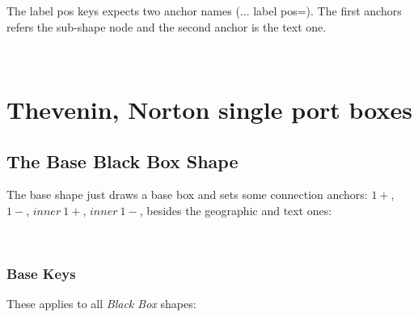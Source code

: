 \documentclass[10pt]{article}
\begin{document}
\begin{tsremark}
The label pos keys expects two anchor names (... label pos=). The first anchors refers the sub-shape node and the second anchor is the text one.
\end{tsremark}

~

\section{Thevenin, Norton single port boxes}


\subsection{The Base Black Box Shape}\label{BBanchors}

The base shape just draws a base box and sets some connection anchors: $1+$, $1-$, $inner\ 1+$, $inner\ 1-$, besides the geographic and text ones:


\begin{center}%
\end{center}

        
~   

\subsubsection{Base Keys}\label{BBkeys}

These applies to all \emph{Black Box} shapes:
\end{document}
